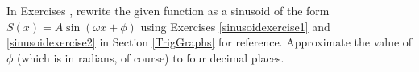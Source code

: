 {\noindent In Exercises}
{, rewrite the given function as a sinusoid of the form $S(x) = A\sin(\omega x + \phi)$ using Exercises \ref{sinusoidexercise1} and \ref{sinusoidexercise2} in Section \ref{TrigGraphs} for reference.  Approximate the value of $\phi$ (which is in radians, of course) to four decimal places.}
